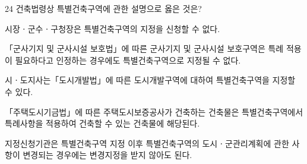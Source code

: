 \begin{question}{24}
건축법령상 특별건축구역에 관한 설명으로 옳은 것은?
\begin{choices}
  \item 시장ㆍ군수ㆍ구청장은 특별건축구역의 지정을 신청할 수 없다.
  \item 「군사기지 및 군사시설 보호법」에 따른 군사기지 및 군사시설 보호구역은 특례 적용이 필요하다고 인정하는 경우에도 특별건축구역으로 지정될 수 없다.
  \item 시ㆍ도지사는「도시개발법」에 따른 도시개발구역에 대하여 특별건축구역을 지정할 수 있다.
  \item 「주택도시기금법」에 따른 주택도시보증공사가 건축하는 건축물은 특별건축구역에서 특례사항을 적용하여 건축할 수 있는 건축물에 해당된다.
  \item 지정신청기관은 특별건축구역 지정 이후 특별건축구역의 도시ㆍ군관리계획에 관한 사항이 변경되는 경우에는 변경지정을 받지 않아도 된다.
\end{choices}
\end{question}

